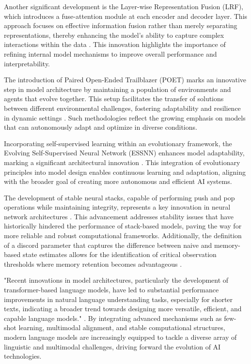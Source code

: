 Another significant development is the Layer-wise Representation Fusion (LRF), which introduces a fuse-attention module at each encoder and decoder layer. This approach focuses on effective information fusion rather than merely separating representations, thereby enhancing the model's ability to capture complex interactions within the data \cite{zheng2023layerwiserepresentationfusioncompositional}. This innovation highlights the importance of refining internal model mechanisms to improve overall performance and interpretability.



The introduction of Paired Open-Ended Trailblazer (POET) marks an innovative step in model architecture by maintaining a population of environments and agents that evolve together. This setup facilitates the transfer of solutions between different environmental challenges, fostering adaptability and resilience in dynamic settings \cite{wang2019pairedopenendedtrailblazerpoet}. Such methodologies reflect the growing emphasis on models that can autonomously adapt and optimize in diverse conditions.



Incorporating self-supervised learning within an evolutionary framework, the Evolving Self-Supervised Neural Network (ESSNN) enhances model adaptability, marking a significant architectural innovation \cite{le2019evolvingselfsupervisedneuralnetworks}. This integration of evolutionary principles into model design enables continuous learning and adaptation, aligning with the broader goal of creating more autonomous and efficient AI systems.



The development of stable neural stacks, capable of performing push and pop operations while maintaining integrity, represents a key innovation in neural network architectures \cite{stogin2022provablystableneuralnetwork}. This advancement addresses stability issues that have historically hindered the performance of stack-based models, paving the way for more reliable and robust computational frameworks. Additionally, the definition of a discord parameter that captures the difference between naive and memory-based state estimates allows for the identification of critical observation thresholds where memory retention becomes advantageous \cite{lathouwers2017memorypaysdiscordhidden}.



"Recent innovations in model architectures, particularly the development of transformer-based language models, have led to substantial performance improvements in natural language understanding tasks, especially for shorter texts, indicating a broader trend towards designing more versatile, efficient, and capable language models." \cite{ginzburg2021selfsuperviseddocumentsimilarityranking}. By integrating advanced mechanisms such as few-shot learning, multimodal alignment, and stable computational structures, modern language models are increasingly equipped to tackle a diverse array of linguistic and multimodal challenges, driving forward the evolution of AI technologies.



